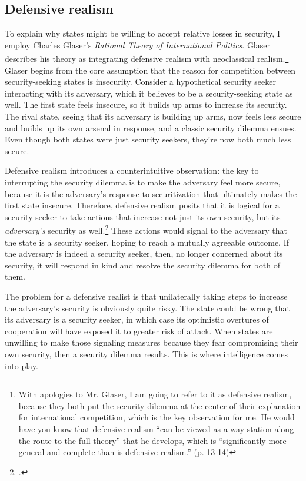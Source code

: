 \documentclass[14pt]{extarticle}
\begin{document}
\subsection{Defensive realism}
To explain why states might be willing to accept relative losses in security, I employ Charles Glaser's \emph{Rational Theory of International Politics}. Glaser describes his theory as integrating defensive realism with neoclassical realism.\footnote{With apologies to Mr. Glaser, I am going to refer to it as defensive realism, because they both put the security dilemma at the center of their explanation for international competition, which is the key observation for me. He would have you know that defensive realism \enquote{can be viewed as a way station along the route to the full theory} that he develops, which is \enquote{significantly more general and complete than is defensive realism.} (p. 13-14)} Glaser begins from the core assumption that the reason for competition between security-seeking states is insecurity. Consider a hypothetical security seeker interacting with its adversary, which it believes to be a security-seeking state as well. The first state feels insecure, so it builds up arms to increase its security. The rival state, seeing that its adversary is building up arms, now feels less secure and builds up its own arsenal in response, and a classic security dilemma ensues. Even though both states were just security seekers, they're now both much less secure.


Defensive realism introduces a counterintuitive observation: the key to interrupting the security dilemma is to make the adversary feel more secure, because it is the adversary's response to securitization that ultimately makes the first state insecure. Therefore, defensive realism posits that it is logical for a security seeker to take actions that increase not just its own security, but its \emph{adversary's} security as well.\footcite[p.~7]{glaser_rational_2010} These actions would signal to the adversary that the state is a security seeker, hoping to reach a mutually agreeable outcome. If the adversary is indeed a security seeker, then, no longer concerned about its security, it will respond in kind and resolve the security dilemma for both of them.

The problem for a defensive realist is that unilaterally taking steps to increase the adversary's security is obviously quite risky. The state could be wrong that its adversary is a security seeker, in which case its optimistic overtures of cooperation will have exposed it to greater risk of attack. When states are unwilling to make those signaling measures because they fear compromising their own security, then a security dilemma results. This is where intelligence comes into play.
\end{document}
